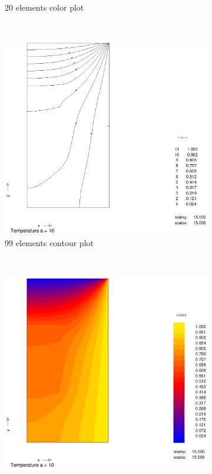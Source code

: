 \documentclass[10pt,a4paper]{article}
\begin{document}
\begin{figure}[h]
\begin{subfigure}[b]{0.45\textwidth}
                \caption{20 elements color plot}
                \label{fig:colplot_a10_50el}
        \end{subfigure}
        ~
        \begin{subfigure}[b]{0.45\textwidth}
                \includegraphics[width=\textwidth]{cont_a10_99el}
                \caption{99 elements contour plot}
                \label{fig:cont_a10_99el}
        \end{subfigure}
        ~ 
        \begin{subfigure}[b]{0.45\textwidth}
                \includegraphics[width=\textwidth]{colplot_a10_99el}

\end{subfigure}
\end{figure}
\end{document}
